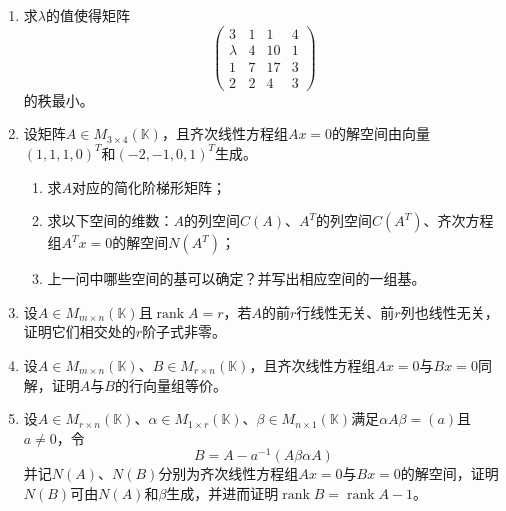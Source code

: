 \documentclass[a4paper,UTF8,fontset=windows]{ctexart}
\DeclareMathOperator{\rank}{rank}
\begin{document}
\begin{enumerate}
    \item 求$\lambda$的值使得矩阵
    $$\begin{pmatrix}3&1&1&4\\\lambda&4&10&1\\1&7&17&3\\2&2&4&3\end{pmatrix}$$
    的秩最小。

    \item 设矩阵$A\in M_{3\times 4}(\mathbb{K})$，且齐次线性方程组$Ax=0$的解空间由向量$(1,1,1,0)^T$和$(-2,-1,0,1)^T$生成。
    \begin{enumerate}
        \item 求$A$对应的简化阶梯形矩阵；
        \item 求以下空间的维数：$A$的列空间$C(A)$、$A^T$的列空间$C(A^T)$、齐次方程组$A^Tx=0$的解空间$N(A^T)$；
        \item 上一问中哪些空间的基可以确定？并写出相应空间的一组基。
    \end{enumerate}

    \item 设$A\in M_{m\times n}(\mathbb{K})$且$\rank A=r$，若$A$的前$r$行线性无关、前$r$列也线性无关，证明它们相交处的$r$阶子式非零。
    
    \item 设$A\in M_{m\times n}(\mathbb{K})$、$B\in M_{r\times n}(\mathbb{K})$，且齐次线性方程组$Ax=0$与$Bx=0$同解，证明$A$与$B$的行向量组等价。
    
    \item 设$A\in M_{r\times n}(\mathbb{K})$、$\alpha\in M_{1\times r}(\mathbb{K})$、$\beta\in M_{n\times 1}(\mathbb{K})$满足$\alpha A\beta=(a)$且$a\ne0$，令
    $$B=A-a^{-1}(A\beta\alpha A)$$
    并记$N(A)$、$N(B)$分别为齐次线性方程组$Ax=0$与$Bx=0$的解空间，证明$N(B)$可由$N(A)$和$\beta$生成，并进而证明$\rank B=\rank A-1$。
\end{enumerate}
\end{document}
